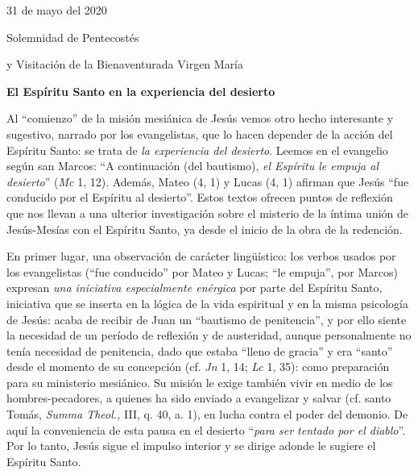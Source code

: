 			\begin{referencia}31 de mayo del 2020\end{referencia}
			
			\begin{referencia}Solemnidad de Pentecostés\end{referencia}
			
			\begin{referencia}y Visitación de la Bienaventurada Virgen María\end{referencia}
			
			\begin{patercite}\textbf{El Espíritu Santo en la experiencia del desierto}\end{patercite}
			
			\begin{patercite}Al “comienzo” de la misión mesiánica de Jesús vemos otro hecho interesante y sugestivo, narrado por los evangelistas, que lo hacen depender de la acción del Espíritu Santo: se trata de \textit{la experiencia del desierto}. Leemos en el evangelio según san Marcos: “A continuación (del bautismo), \textit{el Espíritu le empuja al desierto}” (\textit{Mc} 1, 12). Además, Mateo (4, 1) y Lucas (4, 1) afirman que Jesús “fue conducido por el Espíritu al desierto”. Estos textos ofrecen puntos de reflexión que nos llevan a una ulterior investigación sobre el misterio de la íntima unión de Jesús-Mesías con el Espíritu Santo, ya desde el inicio de la obra de la redención.\end{patercite}
			
			\begin{patercite}En primer lugar, una observación de carácter lingüístico: los verbos usados por los evangelistas (“fue conducido” por Mateo y Lucas; “le empuja”, por Marcos) expresan \textit{una iniciativa especialmente enérgica} por parte del Espíritu Santo, iniciativa que se inserta en la lógica de la vida espiritual y en la misma psicología de Jesús: acaba de recibir de Juan un “bautismo de penitencia”, y por ello siente la necesidad de un período de reflexión y de austeridad, aunque personalmente no tenía necesidad de penitencia, dado que estaba “lleno de gracia” y era “santo” desde el momento de su concepción (cf. \textit{Jn} 1, 14; \textit{Lc} 1, 35): como preparación para su ministerio mesiánico. Su misión le exige también vivir en medio de los hombres-pecadores, a quienes ha sido enviado a evangelizar y salvar (cf. santo Tomás, \textit{Summa Theol.,} III, q. 40, a. 1), en lucha contra el poder del demonio. De aquí la conveniencia de esta pausa en el desierto “\textit{para ser tentado por el diablo}”. Por lo tanto, Jesús sigue el impulso interior y se dirige adonde le sugiere el Espíritu Santo.\end{patercite}
			
